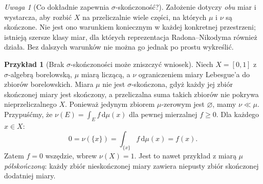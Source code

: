 \documentclass[11pt,a4paper,oneside]{book}
\numberwithin{equation}{chapter}
\theoremstyle{plain}
\theoremstyle{definition}
\newtheorem{przyklad}[twierdzenie]{Przykład}
\theoremstyle{remark}
\newtheorem{uwaga}[twierdzenie]{Uwaga}
\begin{document}
\begin{uwaga}[Co dokładnie zapewnia $\sigma$-skończoność?]
Założenie dotyczy \emph{obu} miar i wystarcza, aby rozbić
$X$ na przeliczalnie wiele części, na których
$\mu$ i $\nu$ są skończone. Nie jest ono warunkiem
koniecznym w każdej konkretnej przestrzeni;
istnieją szersze klasy miar, dla których reprezentacja
Radona--Nikodyma również działa. Bez dalszych warunków
nie można go jednak po prostu wykreślić.
\end{uwaga}

\begin{przyklad}[Brak $\sigma$-skończoności może zniszczyć wniosek]
\label{ex:RN-failure-nonsigma-18}
Niech $X=[0,1]$ z $\sigma$-algebrą borelowską,
$\mu$ miarą liczącą, a $\nu$ ograniczeniem miary
Lebesgue'a do zbiorów borelowskich. Miara $\mu$
nie jest $\sigma$-skończona, gdyż każdy jej zbiór
skończonej miary jest skończony, a przeliczalna suma
takich zbiorów nie pokrywa nieprzeliczalnego $X$.
Ponieważ jedynym zbiorem $\mu$-zerowym jest $\varnothing$,
mamy $\nu\ll\mu$. Przypuśćmy, że
$\nu(E)=\int_Ef\,\mathrm d\mu(x)$ dla pewnej
mierzalnej $f\ge0$. Dla każdego $x\in X$:
\[
0=\nu(\{x\})=\int_{\{x\}}f\,\mathrm d\mu(x)=f(x).
\]
Zatem $f=0$ wszędzie, wbrew
$\nu(X)=1$. Jest to nawet przykład z miarą $\mu$
\emph{półskończoną}: każdy zbiór nieskończonej miary
zawiera niepusty zbiór skończonej dodatniej miary.
\end{przyklad}
\end{document}
